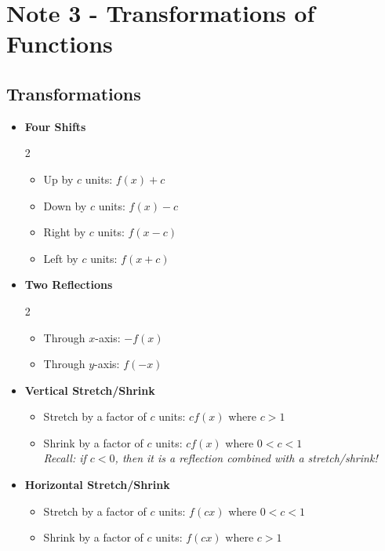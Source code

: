 \documentclass[10pt]{article}
\author{}
\date{}
\begin{document}
\section*{\centering Note 3 - Transformations of Functions}

\subsection*{Transformations}

\begin{itemize}
    \item \textbf{Four Shifts}
        \begin{multicols}{2}
        \begin{itemize}[label=$\circ$]
            \item Up by $c$ units: $f(x) + c$
            \item Down by $c$ units: $f(x) - c$
            \item Right by $c$ units: $f(x-c)$
            \item Left by $c$ units: $f(x + c)$
        \end{itemize}
        \end{multicols}
        
    \item \textbf{Two Reflections}
        \begin{multicols}{2}
        \begin{itemize}[label=$\circ$]
            \item Through $x$-axis: $-f(x)$
            \item Through $y$-axis: $f(-x)$
        \end{itemize}
        \end{multicols}
    
    \item \textbf{Vertical Stretch/Shrink}
        \begin{itemize}[label=$\circ$]
            \item Stretch by a factor of $c$ units: $cf(x)$ where $c > 1$
            \item Shrink by a factor of $c$ units: $cf(x)$ where $0 < c < 1$ \\
            \textit{Recall: if $c < 0$, then it is a reflection combined with a stretch/shrink!}
        \end{itemize}
    
    \item \textbf{Horizontal Stretch/Shrink}
        \begin{itemize}[label=$\circ$]
            \item Stretch by a factor of $c$ units: $f(cx)$ where $0 < c < 1$
            \item Shrink by a factor of $c$ units: $f(cx)$ where $c > 1$ \\
        \end{itemize}


\end{itemize}
\end{document}
